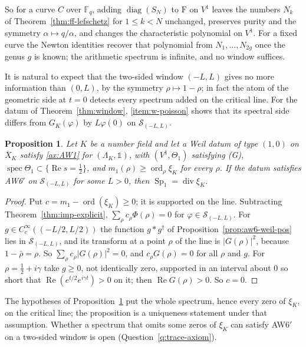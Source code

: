 \documentclass[11pt]{amsart}
\theoremstyle{plain}
\newtheorem{proposition}[theorem]{Proposition}
\theoremstyle{definition}
\theoremstyle{remark}
\numberwithin{equation}{section}
\newcommand{\F}{\mathbb{F}}
\newcommand{\Xbar}{\overline{X}}
\DeclareMathOperator{\spec}{spec}
\DeclareMathOperator{\divisor}{div}
\DeclareMathOperator{\Rea}{Re}
\DeclareMathOperator{\diag}{diag}
\DeclareMathOperator{\ord}{ord}
\renewcommand{\Re}{\Rea}
\begin{document}
So for a curve $C$ over $\F_q$, adding $\diag(S_N)$ to $\mathrm F$ on
$V^1$ leaves the numbers $N_k$ of Theorem~\ref{thm:ff-lefschetz} for
$1\le k<N$ unchanged, preserves purity and the symmetry
$\alpha\mapsto q/\alpha$, and changes the characteristic polynomial on
$V^1$. For a fixed curve the Newton identities recover that polynomial
from $N_1,\dots,N_{2g}$ once the genus $g$ is known; the arithmetic
spectrum is infinite, and no window suffices.

It is natural to expect that the two-sided window $(-L,L)$ gives no
more information than $(0,L)$, by the symmetry $\rho\mapsto1-\rho$; in
fact the atom of the geometric side at $t=0$ detects every spectrum
added on the critical line. For the datum of Theorem~\ref{thm:window},
\ref{item:w-poisson} shows that its spectral side differs from
$G_K(\varphi)$ by $L\varphi(0)$ on $\mathcal S_{(-L,L)}$.

\begin{proposition}\label{prop:window-two}
Let $K$ be a number field and let a Weil datum of type $(1,0)$ on
$\Xbar_K$ satisfy \ref{ax:AW1} for $(\Lambda_K,\mathbb 1)$, with
$(V^1,\Theta_1)$ satisfying (G), $\spec\Theta_1\subset\{\Re s=\tfrac12\}$,
and $m_1(\rho)\ge\ord_\rho\xi_K$ for every $\rho$. If the datum
satisfies AW6$'$ on $\mathcal S_{(-L,L)}$ for some $L>0$, then
$\operatorname{Sp}_1=\divisor\xi_K$.
\end{proposition}

\begin{proof}
Put $c=m_1-\ord(\xi_K)\ge0$; it is supported on the line. Subtracting
Theorem~\ref{thm:imp-explicit}, $\sum_\rho c_\rho\Phi(\rho)=0$ for
$\varphi\in\mathcal S_{(-L,L)}$. For $g\in C_c^\infty((-L/2,L/2))$ the
function $g*g^\dagger$ of Proposition~\ref{prop:aw6-weil-pos} lies in
$\mathcal S_{(-L,L)}$, and its transform at a point $\rho$ of the line
is $|G(\rho)|^2$, because $1-\bar\rho=\rho$. So
$\sum_\rho c_\rho|G(\rho)|^2=0$, and $c_\rho G(\rho)=0$ for all $\rho$
and $g$. For $\rho=\tfrac12+i\gamma$ take $g\ge0$, not identically
zero, supported in an interval about $0$ so short that
$\Re(e^{t/2}e^{i\gamma t})>0$ on it; then $\Re G(\rho)>0$. So $c=0$.
\end{proof}

The hypotheses of Proposition~\ref{prop:window-two} put the whole
spectrum, hence every zero of $\xi_K$, on the critical line; the
proposition is a uniqueness statement under that assumption. Whether a
spectrum that omits some zeros of $\xi_K$ can satisfy AW6$'$
on a two-sided window is open (Question~\ref{q:trace-axiom}).
\end{document}
